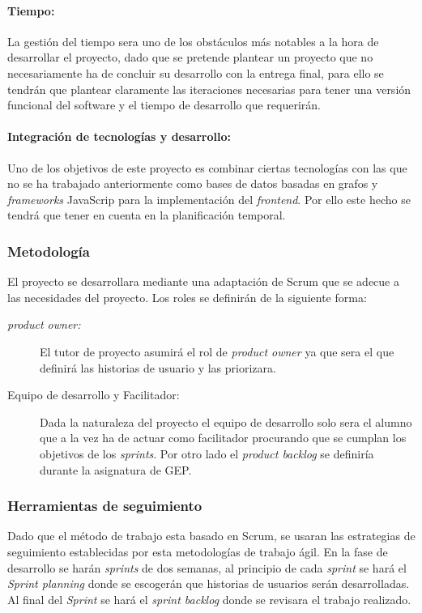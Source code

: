 \documentclass[12pt]{article} %
\begin{document}
\paragraph{Tiempo:}
La gestión del tiempo sera uno de los obstáculos más notables a la hora de desarrollar el proyecto, dado que se pretende plantear un proyecto que no necesariamente ha de concluir su desarrollo con la entrega final, para ello se tendrán que plantear claramente las iteraciones necesarias para tener una versión funcional del software y el tiempo de desarrollo que requerirán.
\paragraph{Integración de tecnologías y desarrollo:}
Uno de los objetivos de este proyecto es combinar ciertas tecnologías con las que no se ha trabajado anteriormente como bases de datos basadas en grafos y \textit{frameworks} JavaScrip para la implementación del \textit{frontend}. Por ello este hecho se tendrá que tener en cuenta en la planificación temporal.

\newpage
\subsubsection{Metodología}
El proyecto se desarrollara mediante una adaptación de Scrum que se adecue a las necesidades del proyecto.
Los roles se definirán de la siguiente forma:
\begin{description}
\item[\textit{product owner:}] El tutor de proyecto asumirá el rol de \textit{product owner} ya que sera el que definirá las historias de usuario y las priorizara.
\item[Equipo de desarrollo y Facilitador:] Dada la naturaleza del proyecto el equipo de desarrollo solo sera el alumno que a la vez ha de actuar como facilitador procurando que se cumplan los objetivos de los \textit{sprints}.
Por otro lado el \textit{product backlog} se definiría durante la asignatura de GEP.
\end{description}

\subsubsection{Herramientas de seguimiento}
Dado que el método de trabajo esta basado en Scrum, se usaran las estrategias de seguimiento establecidas por esta metodologías  de trabajo ágil.
En la fase de desarrollo se harán \textit{sprints} de dos semanas, al principio de cada \textit{sprint} se hará el \textit{Sprint planning} donde se escogerán que historias de usuarios serán desarrolladas. Al final del \textit{Sprint} se hará el \textit{sprint backlog} donde se revisara el trabajo realizado.

\newpage


\nocite{*}

\end{document}
